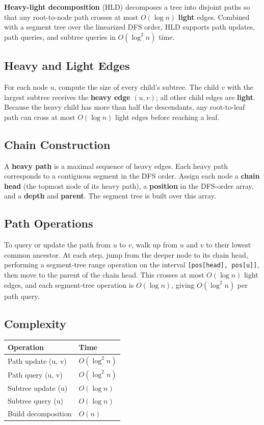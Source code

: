 \textbf{Heavy-light decomposition} (HLD) decomposes a tree into disjoint paths so that any root-to-node path crosses at most $O(\log n)$ \textbf{light} edges. Combined with a segment tree over the linearized DFS order, HLD supports path updates, path queries, and subtree queries in $O(\log^2 n)$ time.

\subsection{Heavy and Light Edges}

For each node $u$, compute the size of every child's subtree. The child $v$ with the largest subtree receives the \textbf{heavy edge} $(u, v)$; all other child edges are \textbf{light}. Because the heavy child has more than half the descendants, any root-to-leaf path can cross at most $O(\log n)$ light edges before reaching a leaf.

\subsection{Chain Construction}

A \textbf{heavy path} is a maximal sequence of heavy edges. Each heavy path corresponds to a contiguous segment in the DFS order. Assign each node a \textbf{chain head} (the topmost node of its heavy path), a \textbf{position} in the DFS-order array, and a \textbf{depth} and \textbf{parent}. The segment tree is built over this array.

\subsection{Path Operations}

To query or update the path from $u$ to $v$, walk up from $u$ and $v$ to their lowest common ancestor. At each step, jump from the deeper node to its chain head, performing a segment-tree range operation on the interval \texttt{[pos[head], pos[u]]}, then move to the parent of the chain head. This crosses at most $O(\log n)$ light edges, and each segment-tree operation is $O(\log n)$, giving $O(\log^2 n)$ per path query.

\subsection{Complexity}

\begin{center}
\begin{tabular}{ll}
\toprule
Operation & Time \\
\midrule
Path update (u, v) & $O(\log^2 n)$ \\
Path query (u, v) & $O(\log^2 n)$ \\
Subtree update (u) & $O(\log n)$ \\
Subtree query (u) & $O(\log n)$ \\
Build decomposition & $O(n)$ \\
\bottomrule
\end{tabular}
\end{center}

